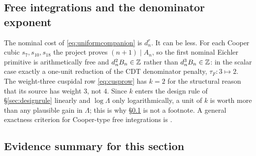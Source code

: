 \subsection{Free integrations and the denominator exponent}\label{sec:free}

The nominal cost of \eqref{eq:uniformcompanion} is $d_n^r$.  It can be less.
For each Cooper cubic $s_7,s_{10},s_{18}$ the project proves $(n+1)\mid A_n$,
so the first nominal Eichler primitive is arithmetically free and
$d_n^2B_n\in\mathbb{Z}$ rather than $d_n^3B_n\in\mathbb{Z}$: in the scalar case exactly a
one-unit reduction of the CDT denominator penalty, $\tau_F:3\mapsto2$.  The
weight-three cuspidal row \eqref{eq:cusprow} has $k=2$ for the structural
reason that its source has weight $3$, not $4$.  Since $k$ enters the design
rule of \S\ref{sec:designrule} linearly and $\log\Lambda$ only
logarithmically, a unit of $k$ is worth more than any plausible gain in
$\Lambda$; this is why \S\ref{sec:free} is not a footnote.  A general
exactness criterion for Cooper-type free integrations is \Open{}.

\subsection{Evidence summary for this section}\label{sec:sec2status}

